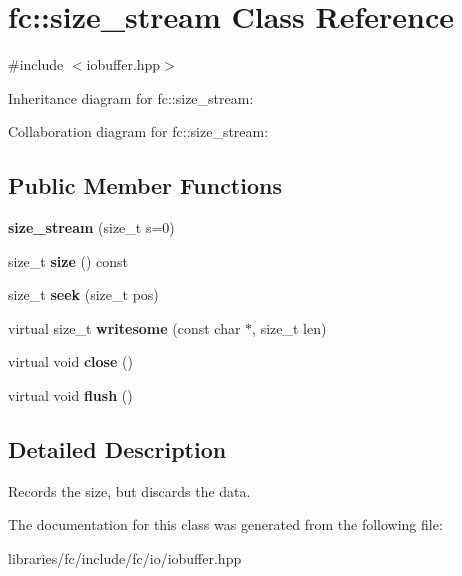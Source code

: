 \hypertarget{classfc_1_1size__stream}{}\section{fc\+:\+:size\+\_\+stream Class Reference}
\label{classfc_1_1size__stream}


{\ttfamily \#include $<$iobuffer.\+hpp$>$}



Inheritance diagram for fc\+:\+:size\+\_\+stream\+:


Collaboration diagram for fc\+:\+:size\+\_\+stream\+:
\subsection*{Public Member Functions}
\begin{DoxyCompactItemize}
\item 
\mbox{\label{classfc_1_1size__stream_a9de774e0d1138fbf37858df22ccfab6a}} 
{\bfseries size\+\_\+stream} (size\+\_\+t s=0)
\item 
\mbox{\label{classfc_1_1size__stream_a4cef807709eaea1f08fac02fadd83c46}} 
size\+\_\+t {\bfseries size} () const
\item 
\mbox{\label{classfc_1_1size__stream_aa41e5c058fb0a5be325a7a2cd0bb638f}} 
size\+\_\+t {\bfseries seek} (size\+\_\+t pos)
\item 
\mbox{\label{classfc_1_1size__stream_a9966959de560c1a06c9efc2652880a1f}} 
virtual size\+\_\+t {\bfseries writesome} (const char $\ast$, size\+\_\+t len)
\item 
\mbox{\label{classfc_1_1size__stream_a33a80c79228026c08315a1f66a857ae2}} 
virtual void {\bfseries close} ()
\item 
\mbox{\label{classfc_1_1size__stream_ad7b0f923baf1511eabfa0856661299b2}} 
virtual void {\bfseries flush} ()
\end{DoxyCompactItemize}


\subsection{Detailed Description}
Records the size, but discards the data. 

The documentation for this class was generated from the following file\+:\begin{DoxyCompactItemize}
\item 
libraries/fc/include/fc/io/iobuffer.\+hpp\end{DoxyCompactItemize}
